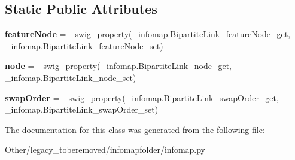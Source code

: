\subsection*{Static Public Attributes}
\begin{DoxyCompactItemize}
\item 
\mbox{\label{classinfomapfolder_1_1infomap_1_1BipartiteLink_a0e037f433eeceb0793adc958ae4360af}} 
{\bfseries feature\+Node} = \+\_\+swig\+\_\+property(\+\_\+infomap.\+Bipartite\+Link\+\_\+feature\+Node\+\_\+get, \+\_\+infomap.\+Bipartite\+Link\+\_\+feature\+Node\+\_\+set)
\item 
\mbox{\label{classinfomapfolder_1_1infomap_1_1BipartiteLink_a67ebc9918cfd2fdc83dcd3bb0b2749f1}} 
{\bfseries node} = \+\_\+swig\+\_\+property(\+\_\+infomap.\+Bipartite\+Link\+\_\+node\+\_\+get, \+\_\+infomap.\+Bipartite\+Link\+\_\+node\+\_\+set)
\item 
\mbox{\label{classinfomapfolder_1_1infomap_1_1BipartiteLink_a84709798834226c1ba2293fe7e10e184}} 
{\bfseries swap\+Order} = \+\_\+swig\+\_\+property(\+\_\+infomap.\+Bipartite\+Link\+\_\+swap\+Order\+\_\+get, \+\_\+infomap.\+Bipartite\+Link\+\_\+swap\+Order\+\_\+set)
\end{DoxyCompactItemize}


The documentation for this class was generated from the following file\+:\begin{DoxyCompactItemize}
\item 
Other/legacy\+\_\+toberemoved/infomapfolder/infomap.\+py\end{DoxyCompactItemize}
